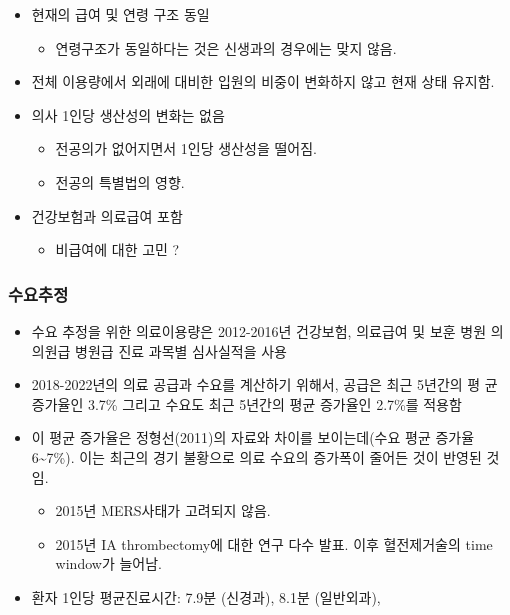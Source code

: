 \documentclass[]{book}
\providecommand{\tightlist}{%
  \setlength{\itemsep}{0pt}\setlength{\parskip}{0pt}}
\begin{document}
\begin{itemize}
\item
  현재의 급여 및 연령 구조 동일

  \begin{itemize}
  \tightlist
  \item
    연령구조가 동일하다는 것은 신생과의 경우에는 맞지 않음.
  \end{itemize}
\item
  전체 이용량에서 외래에 대비한 입원의 비중이 변화하지 않고 현재 상태 유지함.
\item
  의사 1인당 생산성의 변화는 없음

  \begin{itemize}
  \tightlist
  \item
    전공의가 없어지면서 1인당 생산성을 떨어짐.
  \item
    전공의 특별법의 영향.
  \end{itemize}
\item
  건강보험과 의료급여 포함

  \begin{itemize}
  \tightlist
  \item
    비급여에 대한 고민 ?
  \end{itemize}
\end{itemize}

\hypertarget{section-6}{%
\subsubsection{수요추정}\label{section-6}}

\begin{itemize}
\item
  수요 추정을 위한 의료이용량은 2012-2016년 건강보험, 의료급여 및 보훈 병원 의 의원급 병원급 진료 과목별 심사실적을 사용
\item
  2018-2022년의 의료 공급과 수요를 계산하기 위해서, 공급은 최근 5년간의 평 균 증가율인 3.7\% 그리고 수요도 최근 5년간의 평균 증가율인 2.7\%를 적용함
\item
  이 평균 증가율은 정형선(2011)의 자료와 차이를 보이는데(수요 평균 증가율 6\textasciitilde7\%). 이는 최근의 경기 불황으로 의료 수요의 증가폭이 줄어든 것이 반영된 것임.

  \begin{itemize}
  \tightlist
  \item
    2015년 MERS사태가 고려되지 않음.
  \item
    2015년 IA thrombectomy에 대한 연구 다수 발표. 이후 혈전제거술의 time window가 늘어남.
  \end{itemize}
\item
  환자 1인당 평균진료시간: 7.9분 (신경과), 8.1분 (일반외과),
\end{itemize}
\end{document}
